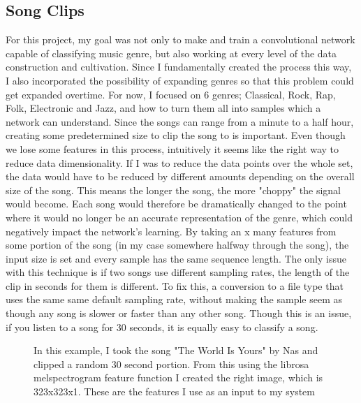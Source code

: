 \documentclass[10pt,twocolumn,letterpaper]{article}
\begin{document}
\subsection{Song Clips}
For this project, my goal was not only to make and train a convolutional network capable of classifying music genre, but also working at every level of the data construction and cultivation. Since I fundamentally created the process this way, I also incorporated the possibility of expanding genres so that this problem could get expanded overtime. For now, I focused on 6 genres; Classical, Rock, Rap, Folk, Electronic and Jazz, and how to turn them all into samples which a network can understand.
Since the songs can range from a minute to a half hour, creating some predetermined size to clip the song to is important. Even though we lose some features in this process, intuitively it seems like the right way to reduce data dimensionality. If I was to reduce the data points over the whole set, the data would have to be reduced by different amounts depending on the overall size of the song. This means the longer the song, the more "choppy" the signal would become. Each song would therefore be dramatically changed to the point where it would no longer be an accurate representation of the genre, which could negatively impact the network's learning. By taking an x many features from some portion of the song (in my case somewhere halfway through the song), the input size is set and every sample has the same sequence length. The only issue with this technique is if two songs use different sampling rates, the length of the clip in seconds for them is different. To fix this, a conversion to a file type that uses the same same default sampling rate, without making the sample seem as though any song is slower or faster than any other song.  Though this is an issue, if you listen to a song for 30 seconds, it is equally easy to classify a song. 
\begin{figure}
  \centering
  \hspace*{.2in}
  \caption{In this example, I took the song "The World Is Yours" by Nas \cite{Nas} and clipped a random 30 second portion. From this using the librosa melspectrogram feature function \cite{librosa} I created the right image, which is 323x323x1. These are the features I use as an input to my system}
\end{figure}
\end{document}
